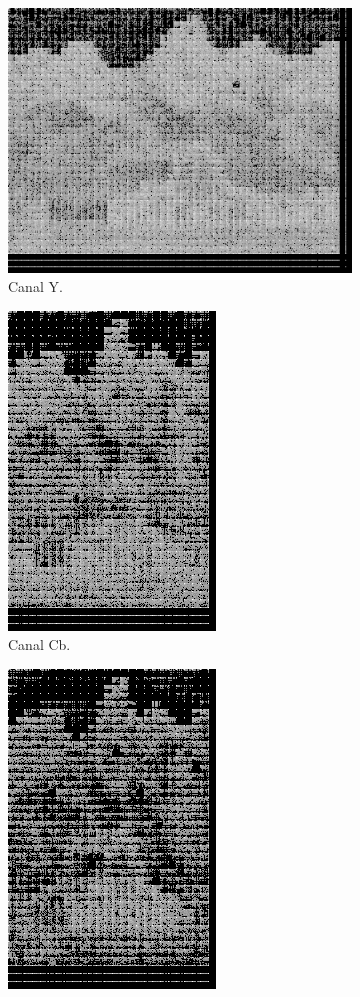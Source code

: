 \documentclass[a4paper, 12pt]{article}
\begin{document}
        \begin{figure}[H]
            \begin{subfigure}{0.3\textwidth}
                \centering
                \includegraphics[scale=0.5]{resources/Quantization/YQuantization100.png}
                \caption{ Canal Y.}
            \end{subfigure}
            \hfill
            \begin{subfigure}{0.3\textwidth}
                \centering 
                \includegraphics[scale=0.5]{resources/Quantization/CBQuantization100.png}
                \caption{ Canal Cb.}
            \end{subfigure}
            \hfill
            \begin{subfigure}{0.3\textwidth}
                \centering
                \includegraphics[scale=0.5]{resources/Quantization/CRQuantization100.png} 

\end{subfigure}
\end{figure}
\end{document}
